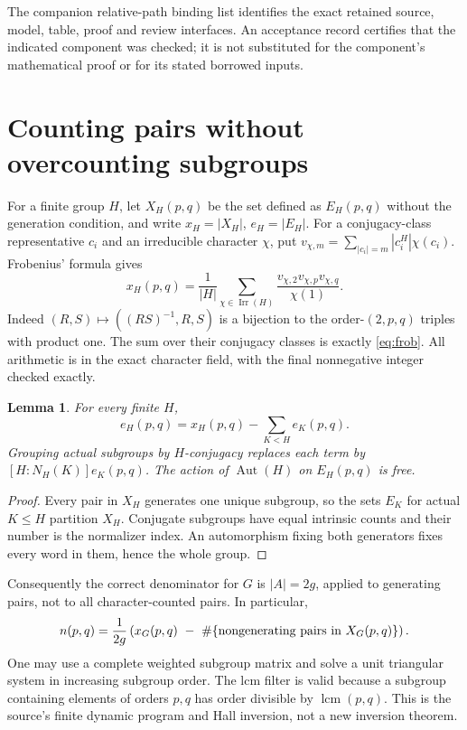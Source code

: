 \documentclass[11pt,a4paper]{article}
\newtheorem{lemma}[theorem]{Lemma}
\newcommand{\Aut}{\operatorname{Aut}}
\newcommand{\Irr}{\operatorname{Irr}}
\begin{document}
The companion relative-path binding list identifies the exact retained
source, model, table, proof and review interfaces. An acceptance record
certifies that the indicated component was checked; it is not substituted
for the component's mathematical proof or for its stated borrowed inputs.

\section{Counting pairs without overcounting subgroups}\label{sec:counting}
For a finite group $H$, let $X_H(p,q)$ be the set defined as $E_H(p,q)$
without the generation condition, and write $x_H=|X_H|$, $e_H=|E_H|$.
For a conjugacy-class representative $c_i$ and an irreducible character
$\chi$, put $v_{\chi,m}=\sum_{|c_i|=m}|c_i^H|\chi(c_i)$.
Frobenius' formula gives
\begin{equation}\label{eq:frob}
 x_H(p,q)=\frac1{|H|}\sum_{\chi\in\Irr(H)}
       \frac{v_{\chi,2}v_{\chi,p}v_{\chi,q}}{\chi(1)}.
\end{equation}
Indeed $(R,S)\mapsto((RS)^{-1},R,S)$ is a bijection to the
order-$(2,p,q)$ triples with product one. The sum over their conjugacy
classes is exactly \eqref{eq:frob}. All arithmetic is in the exact
character field, with the final nonnegative integer checked exactly.

\begin{lemma}\label{lem:partition}
For every finite $H$,
\[
 e_H(p,q)=x_H(p,q)-\sum_{K<H}e_K(p,q).
\]
Grouping actual subgroups by $H$-conjugacy replaces each term by
$[H:N_H(K)]e_K(p,q)$. The action of $\Aut(H)$ on $E_H(p,q)$ is free.
\end{lemma}
\begin{proof}
Every pair in $X_H$ generates one unique subgroup, so the sets $E_K$ for
actual $K\leq H$ partition $X_H$. Conjugate subgroups have equal intrinsic
counts and their number is the normalizer index. An automorphism fixing
both generators fixes every word in them, hence the whole group.
\end{proof}
Consequently the correct denominator for $G$ is $|A|=2g$, applied to
generating pairs, not to all character-counted pairs. In particular,
\[
 n(p,q)=\frac1{2g}\left(x_G(p,q)\ -\
           \#\{\hbox{nongenerating pairs in }X_G(p,q)\}\right).
\]
One may use a complete weighted subgroup matrix and solve a unit
triangular system in increasing subgroup order. The lcm filter is valid
because a subgroup containing elements of orders $p,q$ has order divisible
by $\operatorname{lcm}(p,q)$. This is the source's finite dynamic program
and Hall inversion, not a new inversion theorem.
\end{document}
